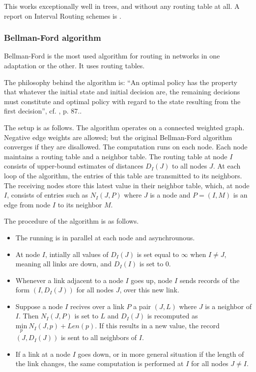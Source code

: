 \documentclass[fleqn,a4paper]{SelfArx}
\begin{document}
\par This works exceptionally well in trees, and without any routing table at all. A report on Interval Routing schemes is \cite{Gavoille:1997LaBRI}.

\subsubsection{Bellman-Ford algorithm}

\par Bellman-Ford is the most used algorithm for routing in networks in one adaptation or the other. It uses routing tables. 

\par The philosophy behind the algorithm is: ``An optimal policy has the property that whatever the initial state and initial decision are, the remaining decisions must constitute and optimal policy with regard to the state resulting from the first decision'', cf. \cite{Bellman:1957}, p. 87..

\par The setup is as follows.
The algorithm operates on a connected weighted graph. Negative edge weights are allowed; but the original Bellman-Ford algorithm converges
if they are disallowed. The computation runs on each node. Each node maintains a routing table and a neighbor table. The routing table at node $I$
consists of upper-bound estimates of distances $D_I(J)$ to all nodes $J$. At each loop of the algorithm, the entries of this table are transmitted
to its neighbors. The receiving nodes store this latest value in their neighbor table, which, at node $I$, consists of entries such as 
$N_I(J,P)$ where $J$ is a node and $P=(I, M)$ is an edge from node $I$ to its neighbor $M$.

\par The procedure of the algorithm is as follows. 
\begin{itemize}
\item The running is in parallel at each node and asynchrounous. 
\item At node $I$, intially all values of $D_I(J)$ is set equal to $\infty$ when $I \neq J$, meaning all links are down, and $D_I(I)$ is set to $0$. \item Whenever a link adjacent to a node $I$ goes up, node $I$ sends records of the form $(I, D_I(J))$ for all nodes $J$, over this new link.
\item Suppose a node $I$ recives over a link $P$ a pair $(J, L)$ where $J$ is a neighbor of $I$. Then $N_I(J, P)$ is set to $L$ and $D_I(J)$
is recomputed as $\underset{p}{\mathrm{min}}\ N_I(J,p) + Len(p)$. If this results in a new value, the record $(J, D_I(J))$ is sent to all 
neighbors of $I$.
\item If a link at a node $I$ goes down, or in more general situation if the length of the link changes, the same computation is performed 
at $I$ for all nodes $J \neq I$.
\end{itemize}
\end{document}
